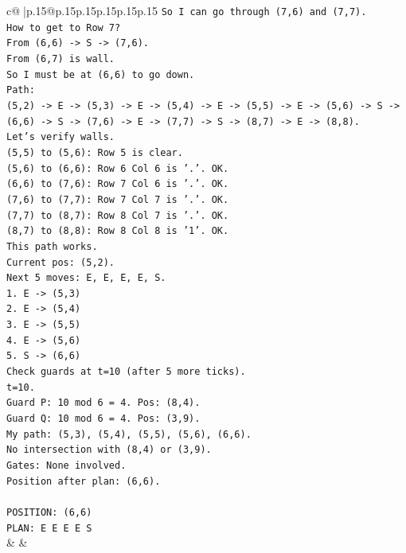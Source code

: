 \documentclass{article}
\begin{document}
{\begin{supertabular}{c@{$\;$}|p{.15\linewidth}@{}p{.15\linewidth}p{.15\linewidth}p{.15\linewidth}p{.15\linewidth}p{.15\linewidth}}
{{{\texttt{So I can go through (7,6) and (7,7).} \\
\texttt{How to get to Row 7?} \\
\texttt{From (6,6) {-}> S {-}> (7,6).} \\
\texttt{From (6,7) is wall.} \\
\texttt{So I must be at (6,6) to go down.} \\
\texttt{Path:} \\
\texttt{(5,2) {-}> E {-}> (5,3) {-}> E {-}> (5,4) {-}> E {-}> (5,5) {-}> E {-}> (5,6) {-}> S {-}> (6,6) {-}> S {-}> (7,6) {-}> E {-}> (7,7) {-}> S {-}> (8,7) {-}> E {-}> (8,8).} \\
\texttt{Let's verify walls.} \\
\texttt{(5,5) to (5,6): Row 5 is clear.} \\
\texttt{(5,6) to (6,6): Row 6 Col 6 is '.'. OK.} \\
\texttt{(6,6) to (7,6): Row 7 Col 6 is '.'. OK.} \\
\texttt{(7,6) to (7,7): Row 7 Col 7 is '.'. OK.} \\
\texttt{(7,7) to (8,7): Row 8 Col 7 is '.'. OK.} \\
\texttt{(8,7) to (8,8): Row 8 Col 8 is '1'. OK.} \\
\texttt{This path works.} \\
\texttt{Current pos: (5,2).} \\
\texttt{Next 5 moves: E, E, E, E, S.} \\
\texttt{1. E {-}> (5,3)} \\
\texttt{2. E {-}> (5,4)} \\
\texttt{3. E {-}> (5,5)} \\
\texttt{4. E {-}> (5,6)} \\
\texttt{5. S {-}> (6,6)} \\
\texttt{Check guards at t=10 (after 5 more ticks).} \\
\texttt{t=10.} \\
\texttt{Guard P: 10 mod 6 = 4. Pos: (8,4).} \\
\texttt{Guard Q: 10 mod 6 = 4. Pos: (3,9).} \\
\texttt{My path: (5,3), (5,4), (5,5), (5,6), (6,6).} \\
\texttt{No intersection with (8,4) or (3,9).} \\
\texttt{Gates: None involved.} \\
\texttt{Position after plan: (6,6).} \\
\\ 
\texttt{POSITION: (6,6)} \\
\texttt{PLAN: E E E E S} \\
            }
        }
    }
    & & \\ \\


\end{supertabular}}
\end{document}
